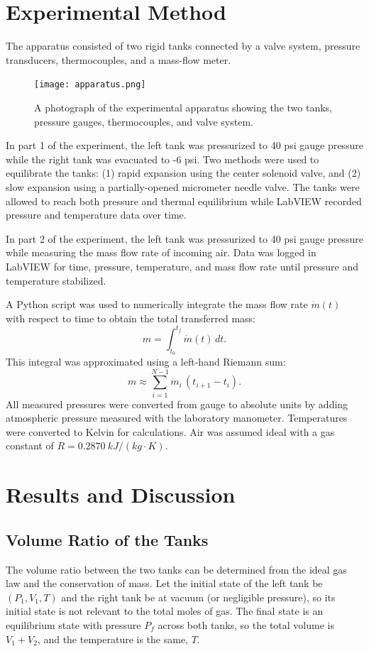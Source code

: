 \documentclass[12pt]{article}
\begin{document}
\section*{Experimental Method}
The apparatus consisted of two rigid tanks connected by a valve system, pressure transducers, thermocouples, and a mass-flow meter.

\begin{figure}[h!]
\centering
\texttt{[image: apparatus.png]}
\caption{A photograph of the experimental apparatus showing the two tanks, pressure gauges, thermocouples, and valve system.}
\label{fig:apparatus}
\end{figure}

In part 1 of the experiment, the left tank was pressurized to 40 psi gauge pressure while the right tank was evacuated to -6 psi.
Two methods were used to equilibrate the tanks:
(1) rapid expansion using the center solenoid valve, and
(2) slow expansion using a partially-opened micrometer needle valve.
The tanks were allowed to reach both pressure and thermal equilibrium while LabVIEW recorded pressure and temperature data over time.

In part 2 of the experiment, the left tank was pressurized to 40 psi gauge pressure while measuring the mass flow rate of incoming air. 
Data was logged in LabVIEW for time, pressure, temperature, and mass flow rate until pressure and temperature stabilized.

A Python script was used to numerically integrate the mass flow rate \(\dot m(t)\) with respect to time to obtain the total transferred mass:
\[
m = \int_{t_0}^{t_f} \dot m(t)\,dt.
\]
This integral was approximated using a left-hand Riemann sum:
\[
m \approx \sum_{i=1}^{N-1} \dot m_i \,(t_{i+1}-t_i).
\]
All measured pressures were converted from gauge to absolute units by adding atmospheric pressure measured with the laboratory manometer. Temperatures were converted to Kelvin for calculations. Air was assumed ideal with a gas constant of \(R = 0.2870~\si{kJ/(kg\cdot K)}\).

\section*{Results and Discussion}


\subsection*{Volume Ratio of the Tanks}
The volume ratio between the two tanks can be determined from the ideal gas law and the conservation of mass. Let the initial state of the left tank be $(P_1, V_1, T)$ and the right tank be at vacuum (or negligible pressure), so its initial state is not relevant to the total moles of gas. The final state is an equilibrium state with pressure $P_f$ across both tanks, so the total volume is $V_1 + V_2$, and the temperature is the same, $T$.
\end{document}

